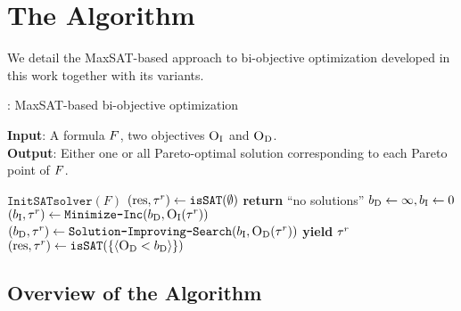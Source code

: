 \chapter{The \algname{} Algorithm\label{chap:approach}}

We detail the MaxSAT-based approach to bi-objective optimization developed in this work together with its variants.

\begin{algorithm}[t]
  \caption{\algname{}: MaxSAT-based  bi-objective optimization} %
  \label{alg:base-algorithm}
  \textbf{Input}: A formula $F$, two objectives $\textsc{O}_{\text{I}}$ and $\textsc{O}_{\text{D}}$.\\
  \textbf{Output}: Either one or all Pareto-optimal solution corresponding to each Pareto point of $F$.

  \begin{algorithmic}[1]
    \STATE $\texttt{InitSATsolver}(F)$ \label{l:init-solv} 
    \STATE $(\text{res}, \tau^r) \gets \texttt{isSAT}(\emptyset)$ \quad{}  \label{l:sols} 
      \STATE \textbf{return} ``no solutions''
    \ENDIF
    \STATE $b_{\text{D}} \gets \infty, b_{\text{I}} \gets 0$ \label{l:bounds}
     \label{l:loopstart}
      \STATE $(b_{\text{I}}, \tau^r) \gets \texttt{Minimize-\allowbreak{}Inc}(b_{\text{D}} , \textsc{O}_{\text{I}}(\tau^r))$  \quad{}\label{l:minim1}
      \STATE $(b_{\text{D}}, \tau^r) \gets  \texttt{Solution-\allowbreak{}Improving-\allowbreak{}Search}(b_{\text{I}} , \textsc{O}_{\text{D}}(\tau^r))$  \quad{}\label{l:minim2}
      \STATE \textbf{yield} $\tau^r$  \quad{} \label{ln:stage3} 
      \STATE $(\text{res}, \tau^r) \gets \texttt{isSAT}(\{\langle \textsc{O}_{\text{D}} < b_{\text{D}} \rangle\})$\label{l:endL}
    \ENDWHILE
  \end{algorithmic}
\end{algorithm}


\section{Overview of the Algorithm\label{sec:algorithm}}


